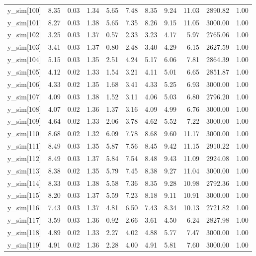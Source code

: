 \begin{table}[ht]
\begin{tabular}{rrrrrrrrrrr}
  y\_sim[100] & 8.35 & 0.03 & 1.34 & 5.65 & 7.48 & 8.35 & 9.24 & 11.03 & 2890.82 & 1.00 \\ 
  y\_sim[101] & 8.27 & 0.03 & 1.38 & 5.65 & 7.35 & 8.26 & 9.15 & 11.05 & 3000.00 & 1.00 \\ 
  y\_sim[102] & 3.25 & 0.03 & 1.37 & 0.57 & 2.33 & 3.23 & 4.17 & 5.97 & 2765.06 & 1.00 \\ 
  y\_sim[103] & 3.41 & 0.03 & 1.37 & 0.80 & 2.48 & 3.40 & 4.29 & 6.15 & 2627.59 & 1.00 \\ 
  y\_sim[104] & 5.15 & 0.03 & 1.35 & 2.51 & 4.24 & 5.17 & 6.06 & 7.81 & 2864.39 & 1.00 \\ 
  y\_sim[105] & 4.12 & 0.02 & 1.33 & 1.54 & 3.21 & 4.11 & 5.01 & 6.65 & 2851.87 & 1.00 \\ 
  y\_sim[106] & 4.33 & 0.02 & 1.35 & 1.68 & 3.41 & 4.33 & 5.25 & 6.93 & 3000.00 & 1.00 \\ 
  y\_sim[107] & 4.09 & 0.03 & 1.38 & 1.52 & 3.11 & 4.06 & 5.03 & 6.80 & 2796.20 & 1.00 \\ 
  y\_sim[108] & 4.07 & 0.02 & 1.36 & 1.37 & 3.16 & 4.09 & 4.99 & 6.76 & 3000.00 & 1.00 \\ 
  y\_sim[109] & 4.64 & 0.02 & 1.33 & 2.06 & 3.78 & 4.62 & 5.52 & 7.22 & 3000.00 & 1.00 \\ 
  y\_sim[110] & 8.68 & 0.02 & 1.32 & 6.09 & 7.78 & 8.68 & 9.60 & 11.17 & 3000.00 & 1.00 \\ 
  y\_sim[111] & 8.49 & 0.03 & 1.35 & 5.87 & 7.56 & 8.45 & 9.42 & 11.15 & 2910.22 & 1.00 \\ 
  y\_sim[112] & 8.49 & 0.03 & 1.37 & 5.84 & 7.54 & 8.48 & 9.43 & 11.09 & 2924.08 & 1.00 \\ 
  y\_sim[113] & 8.38 & 0.02 & 1.35 & 5.79 & 7.45 & 8.38 & 9.27 & 11.04 & 3000.00 & 1.00 \\ 
  y\_sim[114] & 8.33 & 0.03 & 1.38 & 5.58 & 7.36 & 8.35 & 9.28 & 10.98 & 2792.36 & 1.00 \\ 
  y\_sim[115] & 8.20 & 0.03 & 1.37 & 5.59 & 7.23 & 8.18 & 9.11 & 10.91 & 3000.00 & 1.00 \\ 
  y\_sim[116] & 7.43 & 0.03 & 1.37 & 4.81 & 6.50 & 7.43 & 8.34 & 10.13 & 2721.82 & 1.00 \\ 
  y\_sim[117] & 3.59 & 0.03 & 1.36 & 0.92 & 2.66 & 3.61 & 4.50 & 6.24 & 2827.98 & 1.00 \\ 
  y\_sim[118] & 4.89 & 0.02 & 1.33 & 2.27 & 4.02 & 4.88 & 5.77 & 7.47 & 3000.00 & 1.00 \\ 
  y\_sim[119] & 4.91 & 0.02 & 1.36 & 2.28 & 4.00 & 4.91 & 5.81 & 7.60 & 3000.00 & 1.00 \\ 

\end{tabular}
\end{table}

